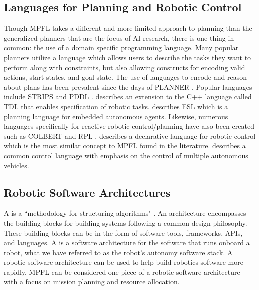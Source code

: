 \subsection{Languages for Planning and Robotic Control}
Though MPFL takes a different and more limited approach to planning than the generalized planners that are the focus of AI research, there is one thing in common: the use of a domain specific programming language. Many popular planners utilize a language which allows users to describe the tasks they want to perform along with constraints, but also allowing constructs for encoding valid actions, start states, and goal state. The use of languages to encode and reason about plans has been prevalent since the days of PLANNER \citep{hewitt:planner}. Popular languages include STRIPS \citep{fikes:strips, fikes:stripsretrospective} and PDDL \citep{mcdermott:pddl}. \citet{simmons:tdl} describes an extension to the C++ language called TDL that enables specification of robotic tasks. \citet{gat:esl} describes ESL which is a planning language for embedded autonomous agents. Likewise, numerous languages specifically for reactive robotic control/planning have also been created such as COLBERT \citep{konolige:colbert} and RPL \citep{mcdermott:rpl}. \citet{peterson:frob} describes a declarative language for robotic control which is the most similar concept to MPFL found in the literature. \citet{eberbach:CCL} describes a common control language with emphasis on the control of multiple autonomous vehicles.

\subsection{Robotic Software Architectures}
A  is a ``methodology for structuring algorithms" \citep{russellnorvig:ai}. An architecture encompasses the building blocks for building systems following a common design philosophy. These building blocks can be in the form of software tools, frameworks, APIs, and languages. A  is a software architecture for the software that runs onboard a robot, what we have referred to as the robot's autonomy software stack. A robotic software architecture can be used to help build robotics software more rapidly. MPFL can be considered one piece of a robotic software architecture with a focus on mission planning and resource allocation. 

